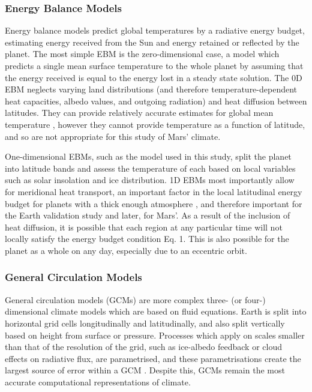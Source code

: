 \documentclass[12pt,onecolumn]{revtex4-2}    %
\begin{document}
\subsubsection{Energy Balance Models}
Energy balance models predict global temperatures by a radiative energy budget, estimating energy received from the Sun and energy retained or reflected by the planet. The most simple EBM is the zero-dimensional case, a model which predicts a single mean surface temperature to the whole planet by assuming that the energy received is equal to the energy lost in a steady state solution. The 0D EBM neglects varying land distributions (and therefore temperature-dependent heat capacities, albedo values, and outgoing radiation) and heat diffusion between latitudes. They can provide relatively accurate estimates for global mean temperature \cite{L20}, however they cannot provide temperature as a function of latitude, and so are not appropriate for this study of Mars' climate.
\

One-dimensional EBMs, such as the model used in this study, split the planet into latitude bands and assess the temperature of each based on local variables such as solar insolation and ice distribution. 1D EBMs most importantly allow for meridional heat transport, an important factor in the local latitudinal energy budget for planets with a thick enough atmosphere \cite{SMS08}, and therefore important for the Earth validation study and later, for Mars'. As a result of the inclusion of heat diffusion, it is possible that each region at any particular time will not locally satisfy the energy budget condition Eq. 1. This is also possible for the planet as a whole on any day, especially due to an eccentric orbit. %

\subsubsection{General Circulation Models}

General circulation models (GCMs) are more complex three- (or four-) dimensional climate models which are based on fluid equations. Earth is split into horizontal grid cells longitudinally and latitudinally, and also split vertically based on height from surface or pressure. Processes which apply on scales smaller than that of the resolution of the grid, such as ice-albedo feedback or cloud effects on radiative flux, are parametrised, and these parametrisations create the largest source of error within a GCM \cite{CBZH}. Despite this, GCMs remain the most accurate computational representations of climate.
\
\end{document}
